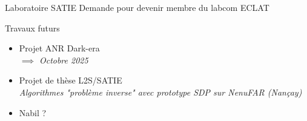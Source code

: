 \documentclass[usenames,dvipsnames]{beamer}
\begin{document}
\begin{frame}
  \vfill
  \begin{block}{Laboratoire SATIE}
    Demande pour devenir membre du labcom ECLAT
  \end{block}
  \vfill

  \begin{block}{Travaux futurs}
    \begin{itemize}
     \item \normalsize{Projet ANR Dark-era} \\
    \small{\textit{$\implies$ Octobre 2025}}\\
    \item \normalsize{Projet de thèse L2S/SATIE} \\%
    \small{\textit{Algorithmes "problème inverse" avec prototype SDP sur NenuFAR (Nançay) }}\\
    \item \normalsize{Nabil ?}%
    \end{itemize}
  \end{block}
  
\end{frame}

\end{document}
